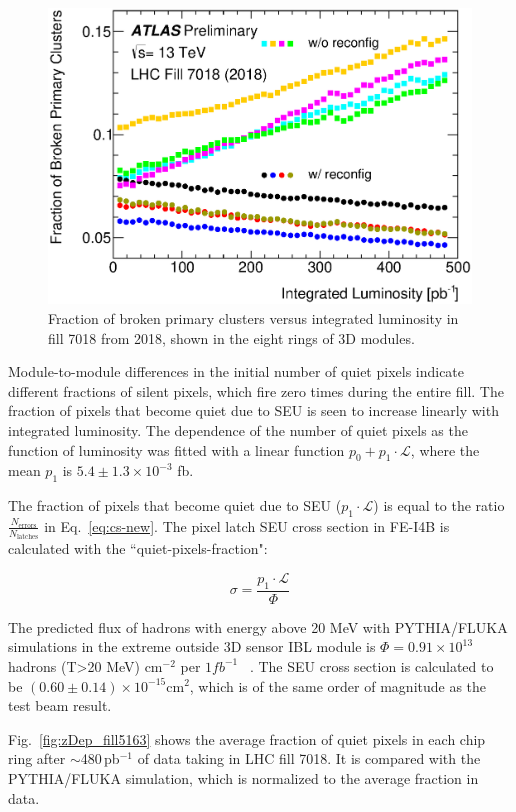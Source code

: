 \begin{figure}[h]
\centering
\includegraphics[width=0.49\linewidth]{figures/ElectronicsChapter/ATLAS/brokenVSlumi_run357451.eps}
\caption{Fraction of broken primary clusters versus integrated luminosity in fill 7018 from 2018, shown in the eight rings of 3D modules.}
\label{fig:broken-fill7018}
\end{figure}

Module-to-module differences in the initial number of quiet pixels indicate different fractions of silent pixels, which fire zero times during the entire fill. The fraction of pixels that become quiet due to SEU is seen to increase linearly with integrated luminosity.
 The dependence of the number of quiet pixels as the function of luminosity
was fitted with a linear function $p_0+p_1\cdot\mathcal{L}$, where the mean $p_1$ is  $5.4 \pm 1.3 \times10^{-3}$ fb.

The fraction of pixels that become quiet due to SEU ($p_1\cdot\mathcal{L}$) is equal to the ratio $\frac{N_{\textrm{errors}}}{N_{\textrm{latches}}}$ in Eq.~\ref{eq:cs-new}.  The pixel latch SEU cross section in FE-I4B is calculated with the ``quiet-pixels-fraction":
\vspace{-0.5cm}
\begin{center}
\begin{equation}
\label{eq:cs-new}
\sigma=\frac{p_1\cdot\mathcal{L}}{\Phi}
\end{equation}
\end{center}
The predicted flux of hadrons with energy above 20 MeV with PYTHIA/FLUKA simulations in the extreme outside 3D sensor IBL module
is ${\Phi}= 0.91\times10^{13}$ hadrons (T>20 MeV) cm$^{-2}$ per $1 fb^{-1}$  ~\cite{ref:IanDawson}.
 The SEU cross section is calculated to be $(0.60 \pm 0.14) \times10^{-15}$cm$^{2}$,
which is of the same order of magnitude as the test beam result.

Fig.~\ref{fig:zDep_fill5163} shows the average fraction of quiet pixels in each chip ring after $\sim$480\,pb$^{-1}$ of data taking in LHC fill 7018. It is compared with the PYTHIA/FLUKA simulation, which is normalized to the average fraction in data.

